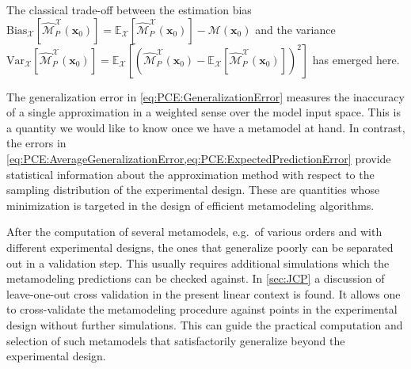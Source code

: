 The classical trade-off between the estimation bias
\(\mathrm{Bias}_{\mathcal{X}}[\hat{\mathcal{M}}_P^{\mathcal{X}}(\bm{x}_0)] = \mathds{E}_{\mathcal{X}}[\hat{\mathcal{M}}_P^{\mathcal{X}}(\bm{x}_0)] - \mathcal{M}(\bm{x}_0)\)
and the variance \(\mathrm{Var}_{\mathcal{X}}[\hat{\mathcal{M}}_P^{\mathcal{X}}(\bm{x}_0)]
= \mathds{E}_{\mathcal{X}}[(\hat{\mathcal{M}}_P^{\mathcal{X}}(\bm{x}_0) - \mathds{E}_{\mathcal{X}}[\hat{\mathcal{M}}_P^{\mathcal{X}}(\bm{x}_0)])^2]\) has emerged here.
\par %
The generalization error in \cref{eq:PCE:GeneralizationError} measures the inaccuracy of a single approximation in a weighted sense over the model input space.
This is a quantity we would like to know once we have a metamodel at hand.
In contrast, the errors in \cref{eq:PCE:AverageGeneralizationError,eq:PCE:ExpectedPredictionError}
provide statistical information about the approximation method with respect to the sampling distribution of the experimental design.
These are quantities whose minimization is targeted in the design of efficient metamodeling algorithms.
\par %
After the computation of several metamodels, e.g.\ of various orders and with different experimental designs, the ones that generalize poorly can be separated out in a validation step.
This usually requires additional simulations which the metamodeling predictions can be checked against.
In \cref{sec:JCP} a discussion of leave-one-out cross validation in the present linear context is found.
It allows one to cross-validate the metamodeling procedure against points in the experimental design without further simulations.
This can guide the practical computation and selection of such metamodels that satisfactorily generalize beyond the experimental design.


